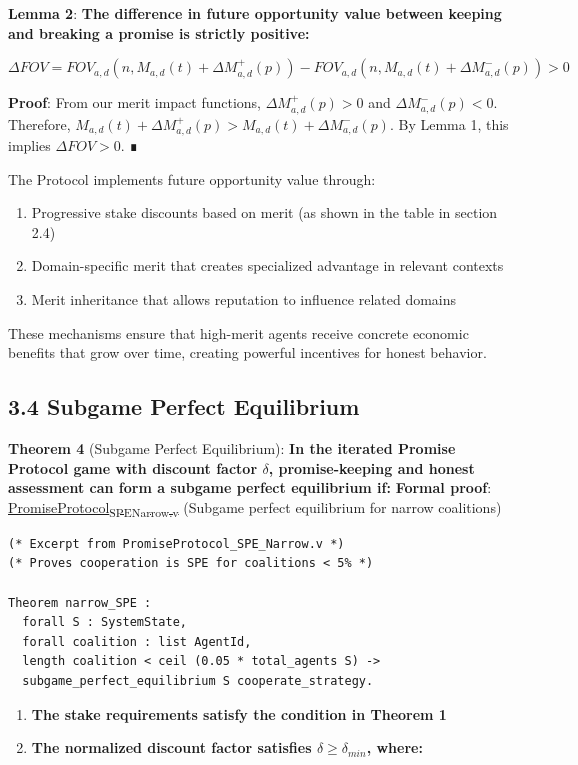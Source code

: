 \documentclass[11pt]{article}
\begin{document}
\textbf{Lemma 2}: \textbf{The difference in future opportunity value between keeping and breaking a promise is strictly positive:}

\(\Delta FOV = FOV_{a,d}(n, M_{a,d}(t) + \Delta M_{a,d}^+(p)) - FOV_{a,d}(n, M_{a,d}(t) + \Delta M_{a,d}^-(p)) > 0\)

\textbf{Proof}: From our merit impact functions, \(\Delta M_{a,d}^+(p) > 0\) and \(\Delta M_{a,d}^-(p) < 0\). Therefore, \(M_{a,d}(t) + \Delta M_{a,d}^+(p) > M_{a,d}(t) + \Delta M_{a,d}^-(p)\). By Lemma 1, this implies \(\Delta FOV > 0\). ∎

The Protocol implements future opportunity value through:

\begin{enumerate}
\item Progressive stake discounts based on merit (as shown in the table in section 2.4)
\item Domain-specific merit that creates specialized advantage in relevant contexts
\item Merit inheritance that allows reputation to influence related domains
\end{enumerate}

These mechanisms ensure that high-merit agents receive concrete economic benefits that grow over time, creating powerful incentives for honest behavior.
\subsection{3.4 Subgame Perfect Equilibrium}
\label{sec:orgedbe7bb}
\textbf{Theorem 4} (Subgame Perfect Equilibrium): \textbf{In the iterated Promise Protocol game with discount factor \(\delta\), promise-keeping and honest assessment can form a subgame perfect equilibrium if:}
\textbf{Formal proof}: \href{../coq/PromiseProtocol\_SPE\_Narrow.v}{PromiseProtocol\textsubscript{SPE}\textsubscript{Narrow.v}} (Subgame perfect equilibrium for narrow coalitions)

\begin{verbatim}
(* Excerpt from PromiseProtocol_SPE_Narrow.v *)
(* Proves cooperation is SPE for coalitions < 5% *)

Theorem narrow_SPE :
  forall S : SystemState,
  forall coalition : list AgentId,
  length coalition < ceil (0.05 * total_agents S) ->
  subgame_perfect_equilibrium S cooperate_strategy.
\end{verbatim}
\begin{enumerate}
\item \textbf{The stake requirements satisfy the condition in Theorem 1}
\item \textbf{The normalized discount factor satisfies \(\delta \geq \delta_{min}\), where:}
\end{enumerate}
\end{document}
